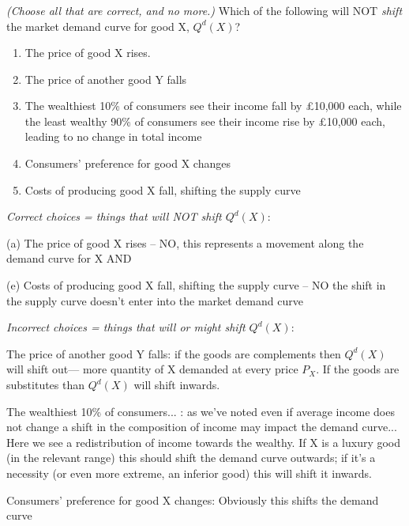 \documentclass[]{article}
\begin{document}
\hypertarget{section-11}{%
\subsubsection{}\label{section-11}}

\emph{(Choose all that are correct, and no more.)} Which of the
following will NOT \emph{shift} the market demand curve for good X,
\(Q^{d}(X)\)?

\begin{enumerate}
\def\labelenumi{\Alph{enumi}.}
\item
  The price of good X rises.
\item
  The price of another good Y falls
\item
  The wealthiest 10\% of consumers see their income fall by £10,000
  each, while the least wealthy 90\% of consumers see their income rise
  by £10,000 each, leading to no change in total income
\item
  Consumers' preference for good X changes
\item
  Costs of producing good X fall, shifting the supply curve
\end{enumerate}

\emph{Correct choices = things that will NOT shift \(Q^{d}(X)\)}:

(a) The price of good X rises -- NO, this represents a movement along
the demand curve for X AND

(e) Costs of producing good X fall, shifting the supply curve -- NO the
shift in the supply curve doesn't enter into the market demand curve

\emph{Incorrect choices = things that will or might shift \(Q^{d}(X)\)}:

The price of another good Y falls: if the goods are complements then
\(Q^{d}(X)\) will shift out--- more quantity of X demanded at every
price \(P_X\). If the goods are substitutes than \(Q^{d}(X)\) will shift
inwards.

The wealthiest 10\% of consumers... : as we've noted even if average
income does not change a shift in the composition of income may impact
the demand curve... Here we see a redistribution of income towards the
wealthy. If X is a luxury good (in the relevant range) this should shift
the demand curve outwards; if it's a necessity (or even more extreme, an
inferior good) this will shift it inwards.

Consumers' preference for good X changes: Obviously this shifts the
demand curve

\hypertarget{section-12}{%
\subsubsection{}\label{section-12}}
\end{document}
